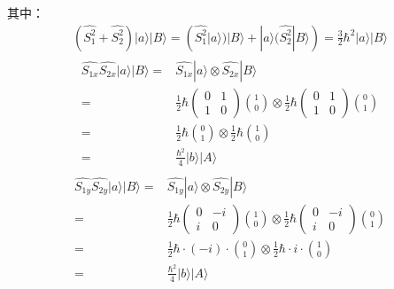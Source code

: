  其中：
 \begin{align}
    (\hat{S_1^2}+\hat{S_2^2})|a\rangle|B\rangle=(\hat{S_1^2}|a\rangle)|B\rangle+|a\rangle(\hat{S_2^2}|B\rangle)=\frac{3}{2}\hbar^2|a\rangle|B\rangle
\end{align}
\begin{align}
    \begin{split}
        \widehat{S_{1x}}\widehat{S_{2x}}|a\rangle|B\rangle=&\hat{S_{1x}}|a\rangle \otimes \widehat{S_{2x}}|B\rangle\\
        =&\frac{1}{2}\hbar \begin{pmatrix}
        0 & 1\\
        1 & 0
        \end{pmatrix}\binom{1}{0}\otimes \frac{1}{2}\hbar \begin{pmatrix}
        0 & 1\\
        1 & 0
        \end{pmatrix}\binom{0}{1}\\
        =&\frac{1}{2}\hbar\binom{0}{1}\otimes \frac{1}{2}\hbar\binom{1}{0}\\
        =&\frac{\hbar^2}{4}|b\rangle|A\rangle
    \end{split}
\end{align}
\begin{align}
    \begin{split}
        \widehat{S_{1y}}\widehat{S_{2y}}|a\rangle|B\rangle=&\hat{S_{1y}}|a\rangle \otimes \widehat{S_{2y}}|B\rangle\\
        =&\frac{1}{2}\hbar \begin{pmatrix}
        0 & -i\\
        i & 0
        \end{pmatrix}\binom{1}{0}\otimes \frac{1}{2}\hbar  \begin{pmatrix}
        0 & -i\\
        i & 0
        \end{pmatrix}\binom{0}{1}\\
        =&\frac{1}{2}\hbar\cdot (-i)\cdot \binom{0}{1}\otimes \frac{1}{2}\hbar\cdot i \cdot \binom{1}{0}\\
        =&\frac{\hbar^2}{4}|b\rangle|A\rangle
    \end{split}
\end{align}
